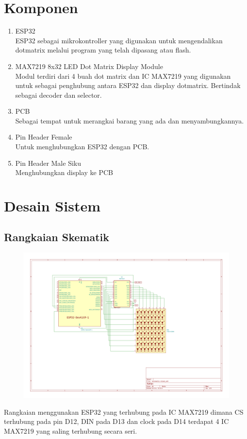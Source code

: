 \documentclass[a4paper,12pt]{article} %
\begin{document}
\section{Komponen}
\begin{enumerate}
    \item ESP32\\
    ESP32 sebagai mikrokontroller yang digunakan untuk mengendalikan dotmatrix
    melalui program yang telah dipasang atau flash. 
    \item MAX7219 8x32 LED Dot Matrix Display Module\\
    Modul terdiri dari 4 buah dot matrix dan IC MAX7219 yang digunakan untuk sebagai 
    penghubung antara ESP32 dan display dotmatrix. Bertindak sebagai decoder dan selector.
    \item PCB\\
    Sebagai tempat untuk merangkai barang yang ada dan menyambungkannya.
    \item Pin Header Female\\
    Untuk menghubungkan ESP32 dengan PCB.
    \item Pin Header Male Siku\\
    Menghubungkan display ke PCB
\end{enumerate}

\section{Desain Sistem}
\subsection{Rangkaian Skematik}
\begin{figure}[h]
    \centering
    \includegraphics[width=1\textwidth]{schematic.png} 
    \label{fig:schematic}
\end{figure}
Rangkaian menggunakan ESP32 yang terhubung pada IC MAX7219 dimana CS 
terhubung pada pin D12, DIN pada D13 dan clock pada D14
terdapat 4 IC MAX7219 yang saling terhubung secara seri.
\end{document}
